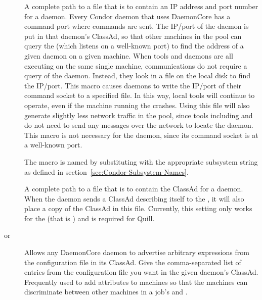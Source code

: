 \begin{description}
\label{param:SubsysAddressFile}
\item[\MacroB{<SUBSYS>\_ADDRESS\_FILE}]
  A complete path to a file that is to contain an
  IP address and port number for a daemon. 
  Every Condor daemon that uses
  DaemonCore has a command port where commands are sent.
  The IP/port of the daemon is put in that daemon's ClassAd,
  so that other machines in the pool can query the
   (which listens on a well-known port)
  to find the address of a given daemon on a given machine.
  When tools and daemons are all executing on the same
  single machine, communications do not require a query of the
   daemon.
  Instead, they look in a file on the local disk
  to find the IP/port.
  This macro causes daemons to write the
  IP/port of their command socket to a specified file.
  In this way,
  local tools will continue to operate,
  even if the machine running the  crashes.
  Using this file will also generate
  slightly less network traffic in the pool,
  since tools including  and
   do not need to send any messages over the network to
  locate the  daemon.
  This macro is not necessary for the  
  daemon, since its command socket is at a well-known port.  
  
  The macro is named by substituting 
  with the appropriate subsystem string as defined in
  section~\ref{sec:Condor-Subsystem-Names}.
  
\label{param:SubsysDaemonAdFile}
\item[\MacroB{<SUBSYS>\_DAEMON\_AD\_FILE}]
  A complete path to a file that is to contain the ClassAd for a daemon.
  When the daemon sends a ClassAd describing itself to the
  , it will also place a copy of the ClassAd in this
  file. Currently, this setting only works for the 
  (that is ) and is required for Quill.

\label{param:SubsysExprs}
\item[\MacroB{<SUBSYS>\_ATTRS} or
\label{param:SubsysAttrs}
\MacroB{<SUBSYS>\_EXPRS}]
  Allows any DaemonCore daemon to advertise arbitrary
  expressions from the configuration file in its ClassAd.  Give the
  comma-separated list of entries from the configuration file you want in the
  given daemon's ClassAd.
  Frequently used to add attributes to machines so that the
  machines can discriminate between other machines in a job's 
   and .


\end{description}
